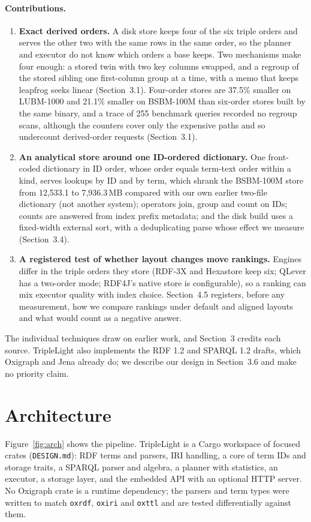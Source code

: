 \documentclass[sigconf, nonacm]{acmart}
\begin{document}
\paragraph{Contributions.}
\begin{enumerate}
  \item \textbf{Exact derived orders.} A disk store keeps four of the six triple orders and serves the other two with the same rows in the same order, so the planner and executor do not know which orders a base keeps. Two mechanisms make four enough: a stored twin with two key columns swapped, and a regroup of the stored sibling one first-column group at a time, with a memo that keeps leapfrog seeks linear (Section~3.1). Four-order stores are 37.5\% smaller on LUBM-1000 and 21.1\% smaller on BSBM-100M than six-order stores built by the same binary, and a trace of 255 benchmark queries recorded no regroup scans, although the counters cover only the expensive paths and so undercount derived-order requests (Section~3.1).
  \item \textbf{An analytical store around one ID-ordered dictionary.} One front-coded dictionary in ID order, whose order equals term-text order within a kind, serves lookups by ID and by term, which shrank the BSBM-100M store from 12,533.1 to 7,936.3\,MB compared with our own earlier two-file dictionary (not another system); operators join, group and count on IDs; counts are answered from index prefix metadata; and the disk build uses a fixed-width external sort, with a deduplicating parse whose effect we measure (Section~3.4).
  \item \textbf{A registered test of whether layout changes move rankings.} Engines differ in the triple orders they store (RDF-3X and Hexastore keep six; QLever has a two-order mode; RDF4J's native store is configurable), so a ranking can mix executor quality with index choice. Section~4.5 registers, before any measurement, how we compare rankings under default and aligned layouts and what would count as a negative answer.
\end{enumerate}
The individual techniques draw on earlier work, and Section~3 credits each source. TripleLight also implements the RDF 1.2 and SPARQL 1.2 drafts, which Oxigraph and Jena already do; we describe our design in Section~3.6 and make no priority claim.

\section{Architecture}
Figure~\ref{fig:arch} shows the pipeline.
TripleLight is a Cargo workspace of focused crates (\texttt{DESIGN.md}): RDF terms and parsers, IRI handling, a core of term IDs and storage traits,
a SPARQL parser and algebra, a planner with statistics, an executor, a storage layer, and the embedded API with an optional HTTP server.
No Oxigraph crate is a runtime dependency; the parsers and term types were written to match \texttt{oxrdf}, \texttt{oxiri} and \texttt{oxttl} and are tested
differentially against them.
\end{document}
